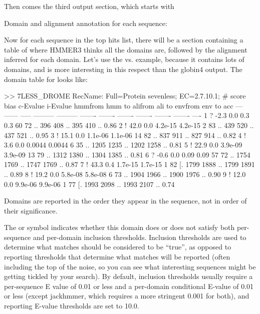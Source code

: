 Then comes the third output section, which starts with

\begin{sreoutput}
Domain and alignment annotation for each sequence:
\end{sreoutput}

Now for each sequence in the top hits list, there will be a section 
containing a table of where HMMER3 thinks all the domains are,
followed by the alignment inferred for each domain. Let's use the
 vs.  example, because it contains lots
of domains, and is more interesting in this respect than the globin4
output.  The domain table for  looks like:

\begin{sreoutput}
>> 7LESS_DROME  RecName: Full=Protein sevenless;          EC=2.7.10.1;
   #    score  bias  c-Evalue  i-Evalue hmmfrom  hmm to    alifrom  ali to    envfrom  env to     acc
 ---   ------ ----- --------- --------- ------- -------    ------- -------    ------- -------    ----
   1 ?   -2.3   0.0       0.3       0.3      60      72 ..     396     408 ..     395     410 .. 0.86
   2 !   42.0   0.0   4.2e-15   4.2e-15       2      83 ..     439     520 ..     437     521 .. 0.95
   3 !   15.1   0.0   1.1e-06   1.1e-06      14      82 ..     837     911 ..     827     914 .. 0.82
   4 !    3.6   0.0    0.0044    0.0044       6      35 ..    1205    1235 ..    1202    1258 .. 0.81
   5 !   22.9   0.0   3.9e-09   3.9e-09      13      79 ..    1312    1380 ..    1304    1385 .. 0.81
   6 ?   -0.6   0.0      0.09      0.09      57      72 ..    1754    1769 ..    1747    1769 .. 0.87
   7 !   43.3   0.4   1.7e-15   1.7e-15       1      82 [.    1799    1888 ..    1799    1891 .. 0.89
   8 !   19.2   0.0   5.8e-08   5.8e-08       6      73 ..    1904    1966 ..    1900    1976 .. 0.90
   9 !   12.0   0.0   9.9e-06   9.9e-06       1      77 [.    1993    2098 ..    1993    2107 .. 0.74
\end{sreoutput}

Domains are reported in the order they appear in the sequence, not in
order of their significance.

The \ccode{!} or  symbol indicates whether this domain does
or does not satisfy both per-sequence and per-domain inclusion
thresholds. Inclusion thresholds are used to determine what matches
should be considered to be ``true'', as opposed to reporting
thresholds that determine what matches will be reported (often
including the top of the noise, so you can see what interesting
sequences might be getting tickled by your search). By default,
inclusion thresholds usually require a per-sequence E value of 0.01 or
less and a per-domain conditional E-value of 0.01 or less (except
jackhmmer, which requires a more stringent 0.001 for both), and
reporting E-value thresholds are set to 10.0.

